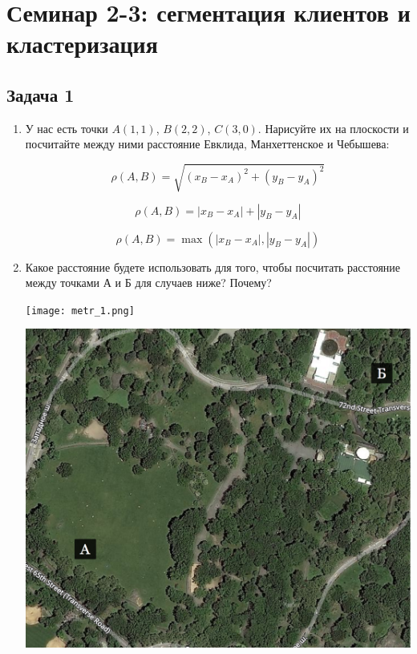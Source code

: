 \documentclass[12pt, a4paper, oneside]{article}
\begin{document}
\section*{Семинар 2-3:  сегментация клиентов и кластеризация}

\subsection*{Задача 1 }

\begin{enumerate}

\item У нас есть точки $A(1,1)$, $B(2,2)$, $C(3,0)$. Нарисуйте их на плоскости и посчитайте между ними расстояние Евклида, Манхеттенское и Чебышева: 

\[ \rho(A,B) = \sqrt{(x_B - x_A)^2 + (y_B - y_A)^2} \]

\[\rho(A,B) = |x_B - x_A| + |y_B - y_A|  \]

\[ \rho(A,B) = \max(|x_B - x_A|, |y_B - y_A|) \]


\item Какое расстояние будете использовать для того, чтобы посчитать расстояние между точками А и Б для случаев ниже? Почему? 

\begin{minipage}[t]{0.45\textwidth}
	\texttt{[image: metr\_1.png]}
\end{minipage}
\hfill
\begin{minipage}[t]{0.45\textwidth}
	\includegraphics[scale=0.12]{metr_2.png}
\end{minipage}


\end{enumerate}
\end{document}
